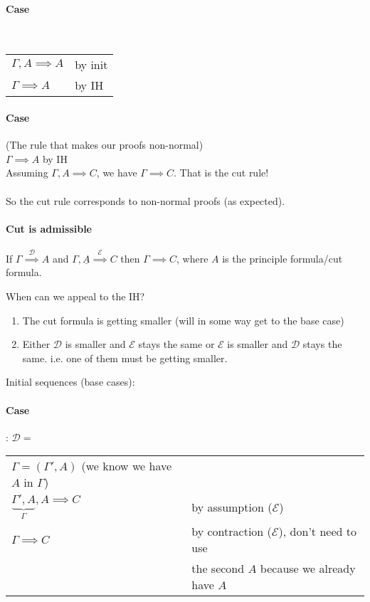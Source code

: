 \documentclass[12 pt]{article}
\begin{document}
	\paragraph{Case} \DP
	\\
	\begin{tabular}{l l}
		$\Gamma, A \implies A$ & by init
		\\ $\Gamma \implies A$ & by IH
	\end{tabular}
	\paragraph{Case} \DP
	(The rule that makes our proofs non-normal)
	\\
$\Gamma \implies A$ by IH
	\\ Assuming $\Gamma, A \implies C$, we have $\Gamma \implies C$. That is the cut rule!
	\\\DP
	\\ So the cut rule corresponds to non-normal proofs (as
	expected).
	\paragraph{Cut is admissible} If $\Gamma \stackrel{\mathcal{D}}{\implies} A$ and
$\Gamma, \underline{A} \stackrel{\mathcal{E}}{\implies} C$ then $\Gamma \implies C$,
	where $A$ is the principle formula/cut formula.

	When can we appeal to the IH?
	\begin{enumerate}
		\item The cut formula is getting smaller (will in some way
		      get to the base case)
		\item Either $\mathcal{D}$ is smaller and $\mathcal{E}$ stays
		      the same or $\mathcal{E}$ is smaller and $\mathcal{D}$
		      stays the same. i.e. one of them must be getting smaller.
	\end{enumerate}
	Initial sequences (base cases):
	\paragraph{Case}: $\mathcal{D} = $ \DP
	\\
	\begin{tabular}{l l}
		$\Gamma = (\Gamma', A)$ (we know we have $A$ in $\Gamma$) &
		\\ $\underbrace{\Gamma', A}_{\Gamma}, A \implies C$ & by assumption ($\mathcal{E}$)
		\\ $\Gamma \implies C$ & by contraction ($\mathcal{E}$), don't need to use
		\\ & the second $A$ because we already have $A$
	\end{tabular}
\end{document}

